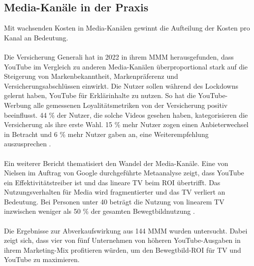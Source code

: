 \subsection{Media-Kanäle in der Praxis}
\label{MediaKanäleInDerPraxis}
Mit wachsenden Kosten in Media-Kanälen gewinnt die Aufteilung der Kosten pro Kanal an Bedeutung. \\\\
Die Versicherung Generali hat in 2022 in ihrem \ac{MMM} herausgefunden, dass YouTube im Vergleich zu anderen Media-Kanälen überproportional stark auf die Steigerung von Markenbekanntheit, Markenpräferenz und Versicherungsabschlüssen einwirkt\cite{DasZusammenspielKundenloyalität2022}. Die Nutzer sollen während des Lockdowns gelernt haben, YouTube für Erklärinhalte zu nutzen. So hat die YouTube-Werbung alle gemessenen Loyalitätsmetriken von der Versicherung positiv beeinflusst. 44 \% der Nutzer, die solche Videos gesehen haben, kategorisieren die Versicherung als ihre erste Wahl. 15 \% mehr Nutzer zogen einen Anbieterwechsel in Betracht und 6 \% mehr Nutzer gaben an, eine Weiterempfehlung auszusprechen \cite{DasZusammenspielKundenloyalität2022}. \\\\
Ein weiterer Bericht thematisiert den Wandel der Media-Kanäle. Eine von Nielsen im Auftrag von Google durchgeführte Metaanalyse zeigt, dass YouTube ein Effektivitätstreiber ist und das lineare TV beim \ac{ROI} übertrifft. Das Nutzungsverhalten für Media wird fragmentierter und das TV verliert an Bedeutung. Bei Personen unter 40 beträgt die Nutzung von linearem TV inzwischen weniger als 50 \% der gesamten Bewegtbildnutzung \cite{237097}.\\\\
Die Ergebnisse zur Abverkaufswirkung aus 144 \ac{MMM} wurden untersucht. Dabei zeigt sich, dass vier von fünf Unternehmen von höheren YouTube-Ausgaben in ihrem Marketing-Mix profitieren würden, um den Bewegtbild-ROI für TV und YouTube zu maximieren\cite{237097}. \\\\
